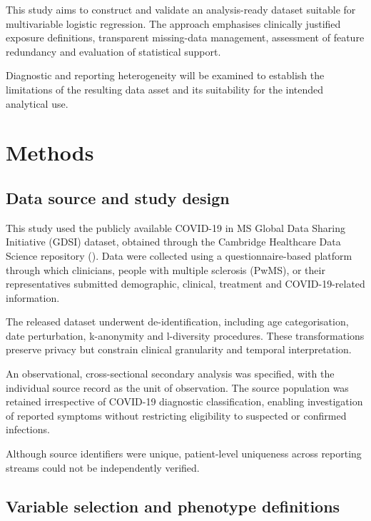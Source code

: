 \documentclass[
  british,
]{article}
\begin{document}
This study aims to construct and validate an analysis-ready dataset
suitable for multivariable logistic regression. The approach emphasises
clinically justified exposure definitions, transparent missing-data
management, assessment of feature redundancy and evaluation of
statistical support.

Diagnostic and reporting heterogeneity will be examined to establish the
limitations of the resulting data asset and its suitability for the
intended analytical use.

\section{Methods}\label{methods}

\subsection{Data source and study
design}\label{data-source-and-study-design}

This study used the publicly available COVID-19 in MS Global Data
Sharing Initiative (GDSI) dataset, obtained through the Cambridge
Healthcare Data Science repository (). Data were collected using a questionnaire-based platform through
which clinicians, people with multiple sclerosis (PwMS), or their
representatives submitted demographic, clinical, treatment and
COVID-19-related information.

The released dataset underwent de-identification, including age
categorisation, date perturbation, k-anonymity and l-diversity
procedures. These transformations preserve privacy but constrain
clinical granularity and temporal interpretation.

An observational, cross-sectional secondary analysis was specified, with
the individual source record as the unit of observation. The source
population was retained irrespective of COVID-19 diagnostic
classification, enabling investigation of reported symptoms without
restricting eligibility to suspected or confirmed infections.

Although source identifiers were unique, patient-level uniqueness across
reporting streams could not be independently verified.

\subsection{Variable selection and phenotype
definitions}\label{variable-selection-and-phenotype-definitions}
\end{document}
